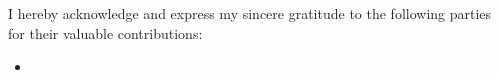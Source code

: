 \begin{acknowledgements}
    I hereby acknowledge and express my sincere gratitude to the following parties for their valuable contributions:
    \begin{itemize}
        \item {}
    \end{itemize}
\end{acknowledgements}